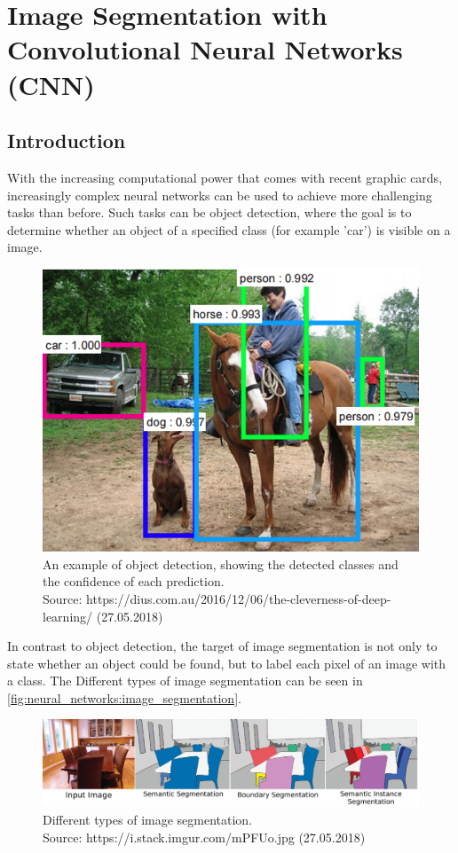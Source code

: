 
\chapter{Image Segmentation with Convolutional Neural Networks (CNN)}
\section{Introduction}
With the increasing computational power that comes with recent graphic cards, increasingly complex neural networks can be used to achieve more challenging tasks than before. Such tasks can be object detection, where the goal is to determine whether an object of a specified class (for example 'car') is visible on a image. 

\begin{figure}[H]
    \centering
	\includegraphics[width=0.6\linewidth]{chapters/neural_networks/images/object_detection.png}
	\caption{An example of object detection, showing the detected classes and the confidence of each prediction.\\ Source: https://dius.com.au/2016/12/06/the-cleverness-of-deep-learning/ (27.05.2018)}
	\label{fig:neural_networks:object_detection}
\end{figure}

In contrast to object detection, the target of image segmentation is not only to state whether an object could be found, but to label each pixel of an image with a class. The Different types of image segmentation can be seen in \autoref{fig:neural_networks:image_segmentation}.

\begin{figure}[H]
    \centering
	\includegraphics[width=0.8\linewidth]{chapters/neural_networks/images/segmentation.jpg}
	\caption{Different types of image segmentation.\\ Source: https://i.stack.imgur.com/mPFUo.jpg (27.05.2018)}
	\label{fig:neural_networks:image_segmentation}
\end{figure}

